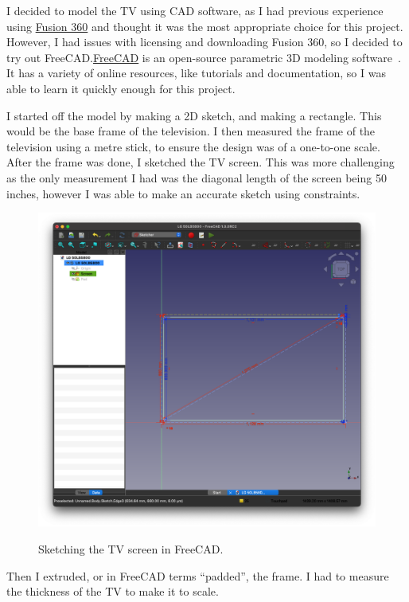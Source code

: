 \documentclass[12pt, letterpaper]{article}
\begin{document}
I decided to model the TV using CAD software, as I had previous
experience using
\href{https://www.autodesk.com/products/fusion-360/overview}{Fusion
360} and thought it was the most appropriate choice for this project.
However, I had issues with licensing and downloading Fusion 360, so I
decided to try out FreeCAD.\@ \href{https://www.freecad.org}{FreeCAD}
is an open-source parametric 3D modeling
software~\autocite{jolahde-2018}. It has a variety of online
resources, like tutorials and documentation, so I was able to learn
it quickly enough for this project.

I started off the model by making a 2D sketch, and making a
rectangle. This would be the base frame of the television. I then
measured the frame of the television using a metre stick, to ensure
the design was of a one-to-one scale. After the frame was done, I
sketched the TV screen. This was more challenging as the only
measurement I had was the diagonal length of the screen being 50
inches, however I was able to make an accurate sketch using constraints.

\begin{figure}[H]
  \medskip
  \centering
  \includegraphics[width=1\linewidth]{a1}
  \caption{Sketching the TV screen in FreeCAD.}
  \medskip\label{fig:a1}
\end{figure}

Then I extruded, or in FreeCAD terms ``padded'', the frame. I had to
measure the thickness of the TV to make it to scale.
\end{document}
